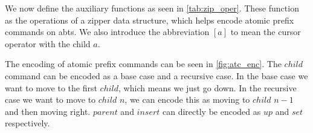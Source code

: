 \documentclass[sigplan,anonymous,review]{acmart}
\begin{document}
We now define the auxiliary functions as seen in \cref{tab:zip_oper}. These function as the operations of a zipper data structure, which helps encode atomic prefix commands on abts. We also introduce the abbreviation $[a]$ to mean the cursor operator with the child $a$.

The encoding of atomic prefix commands can be seen in \cref{fig:atc_enc}. The $child$ command can be encoded as a base case and a recursive case. In the base case we want to move to the first $child$, which means we just go down. In the recursive case we want to move to $child$ $n$, we can encode this as moving to $child$ $n-1$ and then moving right. $parent$ and $insert$ can directly be encoded as $up$ and $set$ respectively.
\end{document}

